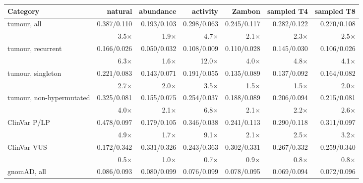 \documentclass[11pt,a4paper]{article}
\begin{document}
\begin{table}[H]
\centering\small\setlength{\tabcolsep}{3.5pt}
\begin{tabular}{@{}lrrrrrr@{}}
\toprule
Category & natural & abundance & activity & Zambon & sampled T4 & sampled T8 \\
\midrule
tumour, all & 0.387/0.110 & 0.193/0.103 & 0.298/0.063 & 0.245/0.117 & 0.282/0.122 & 0.270/0.108 \\
 & {\scriptsize 3.5$\times$} & {\scriptsize 1.9$\times$} & {\scriptsize 4.7$\times$} & {\scriptsize 2.1$\times$} & {\scriptsize 2.3$\times$} & {\scriptsize 2.5$\times$} \\[2pt]
tumour, recurrent & 0.166/0.026 & 0.050/0.032 & 0.108/0.009 & 0.110/0.028 & 0.145/0.030 & 0.106/0.026 \\
 & {\scriptsize 6.3$\times$} & {\scriptsize 1.6$\times$} & {\scriptsize 12.0$\times$} & {\scriptsize 4.0$\times$} & {\scriptsize 4.8$\times$} & {\scriptsize 4.1$\times$} \\[2pt]
tumour, singleton & 0.221/0.083 & 0.143/0.071 & 0.191/0.055 & 0.135/0.089 & 0.137/0.092 & 0.164/0.082 \\
 & {\scriptsize 2.7$\times$} & {\scriptsize 2.0$\times$} & {\scriptsize 3.5$\times$} & {\scriptsize 1.5$\times$} & {\scriptsize 1.5$\times$} & {\scriptsize 2.0$\times$} \\[2pt]
tumour, non-hypermutated & 0.325/0.081 & 0.155/0.075 & 0.254/0.037 & 0.188/0.089 & 0.206/0.094 & 0.215/0.081 \\
 & {\scriptsize 4.0$\times$} & {\scriptsize 2.1$\times$} & {\scriptsize 6.8$\times$} & {\scriptsize 2.1$\times$} & {\scriptsize 2.2$\times$} & {\scriptsize 2.6$\times$} \\[2pt]
ClinVar P/LP & 0.478/0.097 & 0.179/0.105 & 0.346/0.038 & 0.241/0.113 & 0.290/0.118 & 0.311/0.097 \\
 & {\scriptsize 4.9$\times$} & {\scriptsize 1.7$\times$} & {\scriptsize 9.1$\times$} & {\scriptsize 2.1$\times$} & {\scriptsize 2.5$\times$} & {\scriptsize 3.2$\times$} \\[2pt]
ClinVar VUS & 0.172/0.342 & 0.331/0.326 & 0.243/0.363 & 0.302/0.331 & 0.267/0.332 & 0.259/0.340 \\
 & {\scriptsize 0.5$\times$} & {\scriptsize 1.0$\times$} & {\scriptsize 0.7$\times$} & {\scriptsize 0.9$\times$} & {\scriptsize 0.8$\times$} & {\scriptsize 0.8$\times$} \\[2pt]
gnomAD, all & 0.086/0.093 & 0.080/0.099 & 0.076/0.099 & 0.078/0.095 & 0.069/0.094 & 0.072/0.096 \\

\end{tabular}
\end{table}
\end{document}
